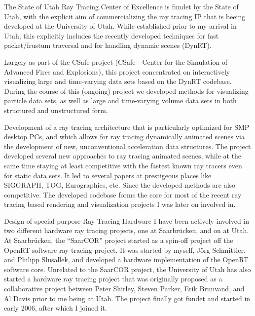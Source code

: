 \documentclass[letterpaper,11pt]{moderncv}
\begin{document}


 {The State of Utah
Ray Tracing Center of Excellence is fundet by the State of Utah, with
the explicit aim of commercializing the ray tracing IP that is beeing
developed at the University of Utah.  While established prior to my
arrival in Utah, this explicitly includes the recently developed
techniques for fast packet/frustum traversal and for handling dynamic
scenes (DynRT).}{}

 { Largely as part of the CSafe project
  (CSafe - Center for the Simulation of Advanced Fires and
  Explosions), this project concentrated on interactively visualizing
  large and time-varying data sets based on the DynRT codebase. During
  the course of this (ongoing) project we developed methods for
  visualizing particle data sets, as well as large and time-varying
  volume data sets in both structured and unstructured form.}{}

 {
Development of a ray tracing architecture that is particularly
optimized for SMP desktop PCs, and which allows for
ray tracing dynamically animated scenes via the development of new,
unconventional acceleration data structures. The project developed
several new approaches to ray tracing animated scenes, while at the
same time staying at least competitive with the fastest known ray
tracers even for static data sets. It led to several papers at
prestigeous places like SIGGRAPH, TOG, Eurographics, etc. Since the
developed methods are also competitive. The developed codebase forms
the core for most of the recent ray tracing based rendering and
visualization projects I was later on involved in.}{}

{Design of special-purpose Ray Tracing Hardware}
%
{I have been actively involved in two different hardware ray tracing
  projects, one at Saarbr\"ucken, and on at Utah. At Saarbr\"ucken,
  the ``SaarCOR'' project started as a spin-off project off the OpenRT
  software ray tracing project. It was started by myself, J\"org
  Schmittler, and Philipp Slusallek, and developed a hardware
  implementation of the OpenRT software core.
%
Unrelated to the SaarCOR project, the University of Utah has also
started a hardware ray tracing project that was originally proposed as
a collaborative project between Peter Shirley, Steven Parker, Erik
Brunvand, and Al Davis prior to me being at Utah. The project finally
got fundet and started in early 2006, after which I joined it.}{}
\end{document}
